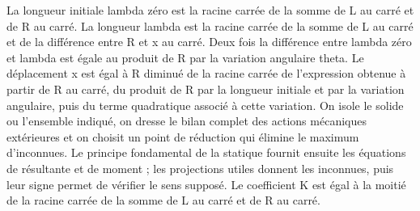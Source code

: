 \begin{corrigebox}[Corrigé]
La longueur initiale lambda zéro est la racine carrée de la somme de L au carré et de R au carré. La longueur lambda est la racine carrée de la somme de L au carré et de la différence entre R et x au carré.
Deux fois la différence entre lambda zéro et lambda est égale au produit de R par la variation angulaire theta.
Le déplacement x est égal à R diminué de la racine carrée de l'expression obtenue à partir de R au carré, du produit de R par la longueur initiale et par la variation angulaire, puis du terme quadratique associé à cette variation.
On isole le solide ou l'ensemble indiqué, on dresse le bilan complet des actions mécaniques extérieures et on choisit un point de réduction qui élimine le maximum d'inconnues. Le principe fondamental de la statique fournit ensuite les équations de résultante et de moment ; les projections utiles donnent les inconnues, puis leur signe permet de vérifier le sens supposé.
Le coefficient K est égal à la moitié de la racine carrée de la somme de L au carré et de R au carré.
\end{corrigebox}
